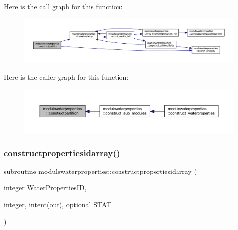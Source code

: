 Here is the call graph for this function\+:\nopagebreak
\begin{figure}[H]
\begin{center}
\leavevmode
\includegraphics[width=350pt]{namespacemodulewaterproperties_ac9b1f4e5840ee5c5f36ff7bee993386b_cgraph}
\end{center}
\end{figure}
Here is the caller graph for this function\+:\nopagebreak
\begin{figure}[H]
\begin{center}
\leavevmode
\includegraphics[width=350pt]{namespacemodulewaterproperties_ac9b1f4e5840ee5c5f36ff7bee993386b_icgraph}
\end{center}
\end{figure}
\mbox{\label{namespacemodulewaterproperties_aa292f8dd2fd9a4ac03ea1234db030644}} 
\subsubsection{\texorpdfstring{constructpropertiesidarray()}{constructpropertiesidarray()}}
{\footnotesize\ttfamily subroutine modulewaterproperties\+::constructpropertiesidarray (\begin{DoxyParamCaption}\item[{integer}]{Water\+Properties\+ID,  }\item[{integer, intent(out), optional}]{S\+T\+AT }\end{DoxyParamCaption})\hspace{0.3cm}{\ttfamily [private]}}

